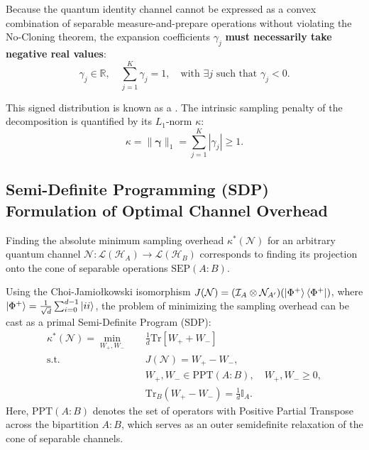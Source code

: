 Because the quantum identity channel cannot be expressed as a convex combination of separable measure-and-prepare operations without violating the No-Cloning theorem, the expansion coefficients $\gamma_j$ \textbf{must necessarily take negative real values}:
\begin{equation}
    \gamma_j \in \mathbb{R}, \quad \sum_{j=1}^K \gamma_j = 1, \quad \text{with } \exists j \text{ such that } \gamma_j < 0.
\end{equation}

This signed distribution is known as a . The intrinsic sampling penalty of the decomposition is quantified by its $L_1$-norm $\kappa$:
\begin{equation}
    \kappa = \|\bm{\gamma}\|_1 = \sum_{j=1}^K |\gamma_j| \ge 1.
    \label{eq:kappa_norm_def_full}
\end{equation}

\subsection{Semi-Definite Programming (SDP) Formulation of Optimal Channel Overhead}
Finding the absolute minimum sampling overhead $\kappa^*(\mathcal{N})$ for an arbitrary quantum channel $\mathcal{N}: \mathcal{L}(\mathcal{H}_A) \to \mathcal{L}(\mathcal{H}_B)$ corresponds to finding its projection onto the cone of separable operations $\text{SEP}(A:B)$.

Using the Choi-Jamio\l kowski isomorphism $J(\mathcal{N}) = (\mathcal{I}_A \otimes \mathcal{N}_{A'})(\ket{\Phi^+}\bra{\Phi^+})$, where $\ket{\Phi^+} = \frac{1}{\sqrt{d}}\sum_{i=0}^{d-1}\ket{ii}$, the problem of minimizing the sampling overhead can be cast as a primal Semi-Definite Program (SDP):
\begin{align}
    \kappa^*(\mathcal{N}) = \min_{W_+, W_-} &\quad \frac{1}{d} \text{Tr}\left[ W_+ + W_- \right] \nonumber \\
    \text{s.t.} &\quad J(\mathcal{N}) = W_+ - W_-, \nonumber \\
    &\quad W_+, W_- \in \text{PPT}(A:B), \quad W_+, W_- \ge 0, \nonumber \\
    &\quad \text{Tr}_B(W_+ - W_-) = \frac{1}{d}\mathbb{I}_A.
    \label{eq:sdp_primal_channel_cut}
\end{align}
Here, $\text{PPT}(A:B)$ denotes the set of operators with Positive Partial Transpose across the bipartition $A:B$, which serves as an outer semidefinite relaxation of the cone of separable channels.


